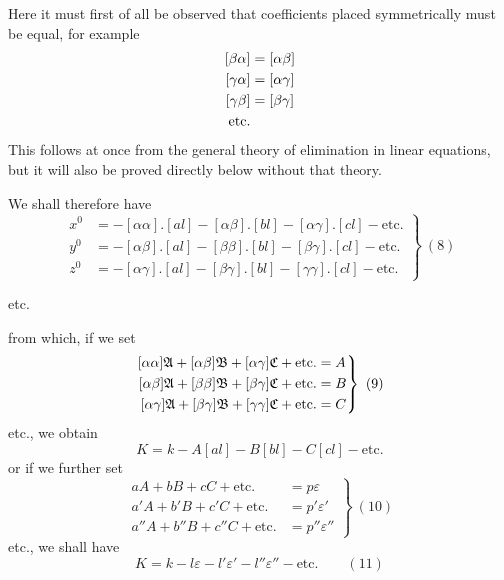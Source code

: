 Here it must first of all be observed that coefficients placed symmetrically must be equal, for example
\[
\begin{aligned}\relax
[\beta\alpha]&=[\alpha\beta]\\
[\gamma\alpha]&=[\alpha\gamma]\\
[\gamma\beta]&=[\beta\gamma]\\
\text{etc.}&
\end{aligned}
\]
This follows at once from the general theory of elimination in linear equations, but it will also be proved directly below without that theory.

We shall therefore have
\[
\left.\begin{aligned}
x^0&=-[\alpha\alpha].[al]-[\alpha\beta].[bl]-[\alpha\gamma].[cl]-\text{etc.}\\
y^0&=-[\alpha\beta].[al]-[\beta\beta].[bl]-[\beta\gamma].[cl]-\text{etc.}\\
z^0&=-[\alpha\gamma].[al]-[\beta\gamma].[bl]-[\gamma\gamma].[cl]-\text{etc.}
\end{aligned}\right\}\ (8)
\]
\begin{center}etc.\end{center}
from which, if we set
\[
\left.\begin{aligned}\relax
[\alpha\alpha]\mathfrak A+[\alpha\beta]\mathfrak B+[\alpha\gamma]\mathfrak C+\text{etc.}&=A\\
[\alpha\beta]\mathfrak A+[\beta\beta]\mathfrak B+[\beta\gamma]\mathfrak C+\text{etc.}&=B\\
[\alpha\gamma]\mathfrak A+[\beta\gamma]\mathfrak B+[\gamma\gamma]\mathfrak C+\text{etc.}&=C
\end{aligned}\right\}\ (9)
\]
etc., we obtain
\[
K=k-A[al]-B[bl]-C[cl]-\text{etc.}
\]
or if we further set
\[
\left.\begin{aligned}
aA+bB+cC+\text{etc.}&=p\varepsilon\\
a'A+b'B+c'C+\text{etc.}&=p'\varepsilon'\\
a''A+b''B+c''C+\text{etc.}&=p''\varepsilon''
\end{aligned}\right\}\ (10)
\]
etc., we shall have
\[
K=k-l\varepsilon-l'\varepsilon'-l''\varepsilon''-\text{etc.}\qquad(11)
\]
\clearpage
